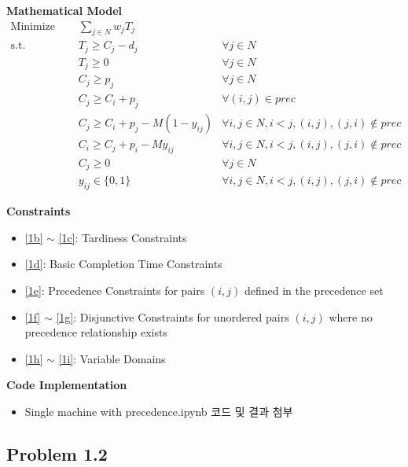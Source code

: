 \documentclass[10pt]{article}
\begin{document}
\textbf{Mathematical Model}
\begin{subequations}
  \begin{align}
    \text{Minimize } \quad & \sum_{j \in N} w_j T_j \label{1a}\\
    \text{s.t.} \quad 
    & T_j \geq C_j - d_j & \forall j \in N \label{1b}\\
    & T_j \geq 0 & \forall j \in N  \label{1c}\\
    & C_j \geq p_j & \forall j \in N \label{1d}\\
    & C_j \geq C_i + p_j & \forall (i, j) \in prec \label{1e}\\
    & C_j \geq C_i + p_j - M(1 - y_{ij}) & \forall i, j \in N, i < j, (i,j), (j,i) \notin prec \label{1f}\\
    & C_i \geq C_j + p_i - M y_{ij} & \forall i, j \in N, i < j, (i,j), (j,i) \notin prec \label{1g}\\
    & C_j \geq 0 & \forall j \in N \label{1h}\\
    & y_{ij} \in \{0, 1\} & \forall i, j \in N, i < j, (i,j), (j,i) \notin prec \label{1i}
  \end{align}
\end{subequations}

\vspace{1em}

\textbf{Constraints}
\begin{itemize}[itemsep=0pt]
  \item \eqref{1b} $\sim$ \eqref{1c}: Tardiness Constraints
  \item \eqref{1d}: Basic Completion Time Constraints
  \item \eqref{1e}: Precedence Constraints for pairs $(i, j)$ defined in the precedence set
  \item \eqref{1f} $\sim$ \eqref{1g}: Disjunctive Constraints for unordered pairs $(i, j)$ where no precedence relationship exists
  \item \eqref{1h} $\sim$ \eqref{1i}: Variable Domains
\end{itemize}

\vspace{1em}

\textbf{Code Implementation}
\begin{itemize}
  \item Single machine with precedence.ipynb 코드 및 결과 첨부
\end{itemize}


\subsection*{Problem 1.2}
\end{document}
